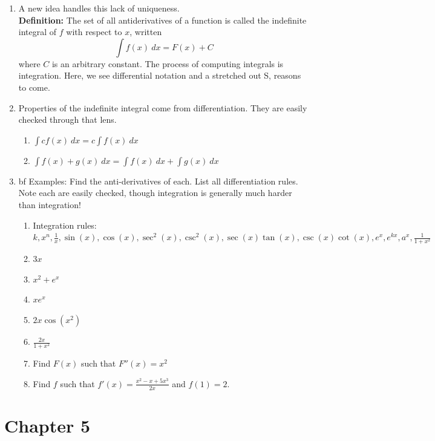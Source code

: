 \documentclass{article}
\newcommand{\ds}{\displaystyle}
\begin{document}
\begin{enumerate}
\item A new idea handles this lack of uniqueness. \\
{\bf Definition:} The set of all antiderivatives of a function is called the indefinite integral of $f$ with respect to $x$, written
$$
\int f(x) ~dx = F(x) + C
$$
where $C$ is an arbitrary constant. The process of computing integrals is integration. Here, we see differential notation and a stretched out S, reasons to come.

\item Properties of the indefinite integral come from differentiation. They are easily checked through that lens.
\begin{enumerate}
\item $\ds \int cf(x) ~dx = c\int f(x) ~dx$
\item $\ds \int f(x) + g(x) ~dx = \int f(x) ~dx + \int g(x)~ dx$
\end{enumerate}

\item {bf Examples:} Find the anti-derivatives of each. List all differentiation rules. Note each are easily checked, though integration is generally much harder than integration!
\begin{enumerate}
\item Integration rules: $k, x^n, \frac{1}{x}, \sin(x), \cos(x), \sec^2(x), \csc^2(x), \sec(x)\tan(x), \csc(x)\cot(x), e^x, e^{kx}, a^x, \frac{1}{1+x^2}$
\item $3x$
\item $x^2+e^x$
\item $xe^x$
\item $2x\cos(x^2)$
\item $\frac{2x}{1+x^2}$
\item Find $F(x)$ such that $F''(x) = x^2$
\item Find $f$ such that $f'(x) = \frac{x^2-x+5x^3}{2x}$ and $f(1)=2$.
\end{enumerate}
\end{enumerate}


\section{Chapter 5}

\end{document}
